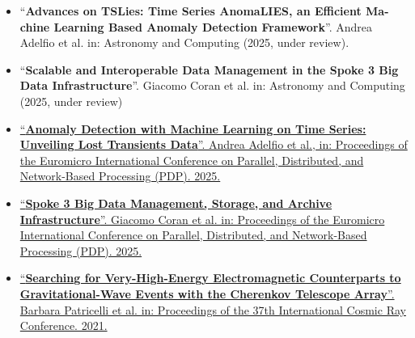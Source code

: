 \documentclass[9pt,a4paper,withhyper,normalphoto]{altacv}
\begin{document}
\begin{itemize}
\item “\textbf{Advances on TSLies: Time Series AnomaLIES, an Efficient Ma-
chine Learning Based Anomaly Detection Framework}”. Andrea Adelfio et al. in: Astronomy and Computing
(2025, under review).
\item “\textbf{Scalable and Interoperable Data Management in the Spoke 3
Big Data Infrastructure}”. Giacomo Coran et al. in: Astronomy and Computing (2025, under review)
\item \href{https://doi.org/10.1109/PDP66500.2025.00062}{“\textbf{Anomaly Detection with Machine Learning on Time Series: Unveiling Lost Transients Data}”. Andrea Adelfio et al., in: Proceedings of the Euromicro International Conference on Parallel, Distributed, and Network-Based Processing (PDP). 2025.}
\item \href{https://doi.org/10.1109/PDP66500.2025.00072}{“\textbf{Spoke 3 Big Data Management, Storage, and Archive Infrastructure}”. Giacomo Coran et al. in: Proceedings of the Euromicro International Conference on Parallel, Distributed, and Network-Based Processing (PDP). 2025.}
\item \href{https://doi.org/10.22323/1.395.0998} {“\textbf{Searching for Very-High-Energy Electromagnetic Counterparts to Gravitational-Wave Events with the Cherenkov Telescope Array}”. Barbara Patricelli et al. in: Proceedings of the 37th International Cosmic Ray Conference. 2021.}
\end{itemize}
\end{document}
